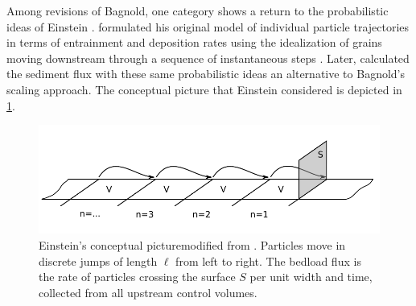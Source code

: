 Among \DIFdelbegin {}\DIFdelend revisions of Bagnold, one category shows a return to the probabilistic ideas of Einstein \citep{Parker2003,Ancey2006}. \DIFdelbegin {}\DIFdelend \DIFaddbegin {}\DIFaddend formulated his original model of individual particle trajectories in terms of entrainment and deposition rates using the idealization of grains moving downstream through a sequence of instantaneous steps \DIFaddbegin {}\DIFaddend .
Later, \DIFdelbegin {}\DIFdelend \DIFaddbegin {}\DIFaddend calculated the sediment flux with these same probabilistic ideas \DIFdelbegin {}\DIFdelend \DIFaddbegin {}\DIFaddend an alternative to Bagnold's scaling approach.
The conceptual picture that Einstein considered is depicted in \DIFdelbegin {}\DIFdelend \DIFaddbegin {}\DIFaddend \ref{fig:einsteinFluxConcept}.
 \begin{figure}[!htbp]
	\includegraphics[width=\linewidth,keepaspectratio]{./figures/ch1/yalinDrawing.pdf}
	\caption{Einstein’s conceptual picture\DIFdelbeginFL \DIFdelFL{(}\DIFdelendFL \DIFaddbeginFL \DIFaddFL{, }\DIFaddendFL modified from \citet{Yalin1972}\DIFdelbeginFL \DIFdelFL{)}\DIFdelendFL \DIFaddbeginFL {}\DIFaddendFL . Particles move in discrete jumps of length $\ell$ from
left to right\DIFdelbeginFL {}\DIFdelendFL . The bedload flux is the rate of particles crossing
the surface $S$ per unit width and time, collected from all upstream control volumes.}
	\label{fig:einsteinFluxConcept}
\end{figure}

